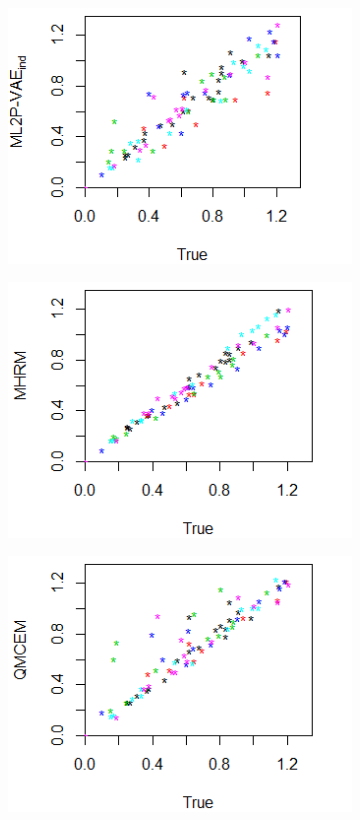 \begin{figure}[h]
\begin{subfigure}{.32\textwidth}
      \includegraphics[width=.9\linewidth]{img/ml_journal_results/6skills/vae_ind_disc_6skills.png}
    \end{subfigure}
    \begin{subfigure}{.32\textwidth}
      \centering
      \includegraphics[width=.9\linewidth]{img/ml_journal_results/6skills/mhrm_disc_6skills.png}
    \end{subfigure}
    \begin{subfigure}{.32\textwidth}
      \centering
      \includegraphics[width=.9\linewidth]{img/ml_journal_results/6skills/qmcem_disc_6skills.png}

\end{subfigure}
\end{figure}
